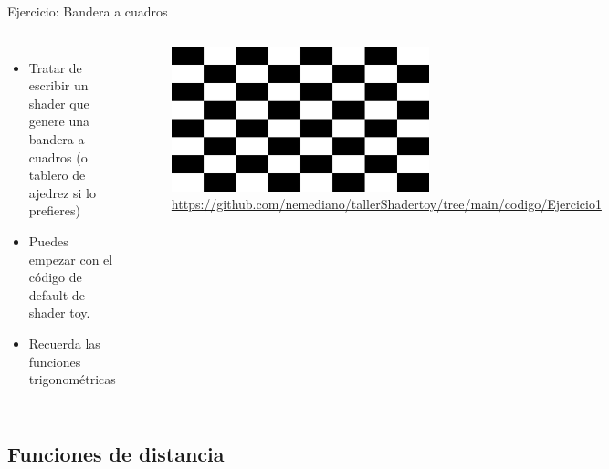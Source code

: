 \begin{frame}{Ejercicio: Bandera a cuadros}
    \begin{columns}
     \begin{itemize}
         \item Tratar de escribir un shader que genere una bandera a cuadros (o tablero de ajedrez si lo prefieres)
         \item Puedes empezar con el código de default de shader toy.
         \item Recuerda las funciones trigonométricas
     \end{itemize}
        \begin{figure}[htb]
            \centering
            \includegraphics[width=0.6\textwidth]{img/Ejer1}
            \caption{\url{https://github.com/nemediano/tallerShadertoy/tree/main/codigo/Ejercicio1}}
        \end{figure}
\end{columns}
\end{frame}


\subsection{Funciones de distancia}

